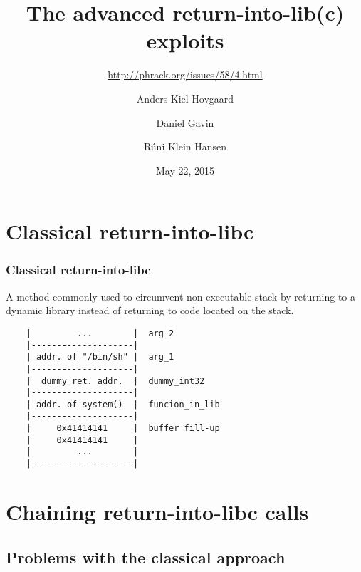 \documentclass[10pt]{beamer}
\title{The advanced return-into-lib(c) exploits}
\subtitle{\url{http://phrack.org/issues/58/4.html}}
\author{Anders Kiel Hovgaard \and Daniel Gavin \and Rúni Klein Hansen}
\institute{Department of Computer Science, University of Copenhagen}
\date{May 22, 2015}
\begin{document}
\frame{\titlepage}

\section{Classical return-into-libc}  %

\begin{frame}[fragile]
  \frametitle{Classical return-into-libc}

  A method commonly used to circumvent non-executable stack by returning to a
  dynamic library instead of returning to code located on the stack.

  \begin{verbatim}
    |         ...        |  arg_2
    |--------------------|
    | addr. of "/bin/sh" |  arg_1
    |--------------------|
    |  dummy ret. addr.  |  dummy_int32
    |--------------------|
    | addr. of system()  |  funcion_in_lib
    |--------------------|
    |     0x41414141     |  buffer fill-up
    |     0x41414141     |
    |         ...        |
    |--------------------|
  \end{verbatim}
\end{frame}

\begin{frame}

\end{frame}

\section{Chaining return-into-libc calls} %

\subsection{Problems with the classical approach}
\end{document}
